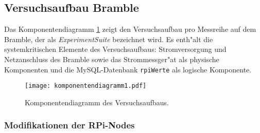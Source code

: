 \subsection{Versuchsaufbau Bramble}\label{Bramble-Versuchsaufbau}

Das Komponentendiagramm \ref{fig:Komponentendiagramm} zeigt den Versuchsaufbau pro Messreihe auf dem Bramble, der als \textit{ExperimentSuite} bezeichnet wird. Es enth"alt die systemkritischen Elemente des Versuchsaufbaus: Stromversorgung und Netzanschluss des Bramble sowie das Strommessger"at als physische Komponenten und die MySQL-Datenbank \texttt{rpiWerte} als logische Komponente. 
\begin{figure}[htb]
  \centering
  \texttt{[image: komponentendiagramm1.pdf]}\\ 
  \caption{Komponentendiagramm des Versuchsaufbaus.}
  \label{fig:Komponentendiagramm}		
\end{figure}

\subsubsection{Modifikationen der RPi-Nodes}

